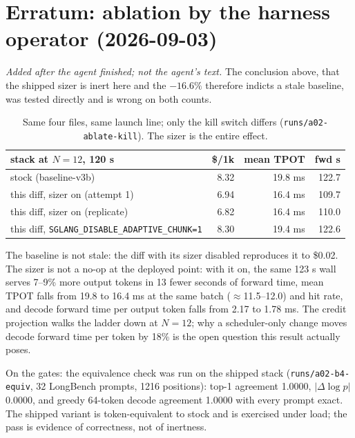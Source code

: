 \documentclass[10pt,twocolumn]{article}
\begin{document}
\section*{Erratum: ablation by the harness operator (2026-09-03)}
\emph{Added after the agent finished; not the agent's text.} The conclusion
above, that the shipped sizer is inert here and the $-16.6\%$ therefore
indicts a stale baseline, was tested directly and is wrong on both counts.
\begin{table}[h]\centering\small
\begin{tabular}{lrrr}
\toprule
stack at $N=12$, 120 s & \$/1k & mean TPOT & fwd s \\
\midrule
stock (baseline-v3b) & 8.32 & 19.8 ms & 122.7 \\
this diff, sizer on (attempt 1) & 6.94 & 16.4 ms & 109.7 \\
this diff, sizer on (replicate) & 6.82 & 16.4 ms & 110.0 \\
this diff, \texttt{SGLANG\_DISABLE\_ADAPTIVE\_CHUNK=1} & 8.30 & 19.4 ms & 122.6 \\
\bottomrule
\end{tabular}
\caption{Same four files, same launch line; only the kill switch differs
(\texttt{runs/a02-ablate-kill}). The sizer is the entire effect.}
\end{table}
The baseline is not stale: the diff with its sizer disabled reproduces it
to \$0.02. The sizer is not a no-op at the deployed point: with it on, the
same 123 s wall serves 7--9\% more output tokens in 13 fewer seconds of
forward time, mean TPOT falls from 19.8 to 16.4 ms at the same batch
($\approx$11.5--12.0) and hit rate, and decode forward time per output token
falls from 2.17 to 1.78 ms. The credit projection walks the ladder down
at $N=12$; why a scheduler-only change moves decode forward time per token
by 18\% is the open question this result actually poses.

On the gates: the equivalence check was run on the shipped stack
(\texttt{runs/a02-b4-equiv}, 32 LongBench prompts, 1216 positions):
top-1 agreement 1.0000, $|\Delta\log p|$ 0.0000, and greedy 64-token
decode agreement 1.0000 with every prompt exact. The shipped variant is
token-equivalent to stock and is exercised under load; the pass is
evidence of correctness, not of inertness.
\end{document}
